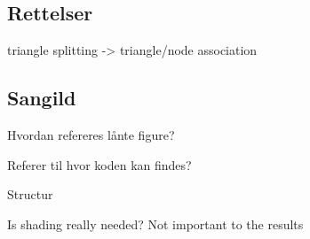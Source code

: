 \subsection*{Rettelser}

triangle splitting -> triangle/node association

\subsection*{Sangild}

Hvordan refereres lånte figure?

Referer til hvor koden kan findes?

Structur

Is shading really needed? Not important to the results
